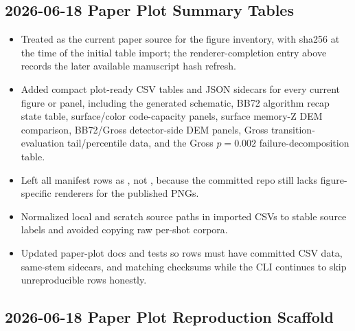 \subsection*{2026-06-18 Paper Plot Summary Tables}

\begin{itemize}
\item Treated \texttt{} as the current paper source for the figure inventory, with sha256 \texttt{} at the time of the initial table import; the renderer-completion entry above records the later available manuscript hash refresh.
\item Added compact plot-ready CSV tables and JSON sidecars for every current figure or panel, including the generated schematic, BB72 algorithm recap state table, surface/color code-capacity panels, surface memory-Z DEM comparison, BB72/Gross detector-side DEM panels, Gross transition-evaluation tail/percentile data, and the Gross \(p=0.002\) failure-decomposition table.
\item Left all manifest rows as \texttt{}, not \texttt{}, because the committed repo still lacks figure-specific renderers for the published PNGs.
\item Normalized local and scratch source paths in imported CSVs to stable source labels and avoided copying raw per-shot corpora.
\item Updated paper-plot docs and tests so \texttt{} rows must have committed CSV data, same-stem sidecars, and matching checksums while the CLI continues to skip unreproducible rows honestly.
\end{itemize}

\subsection*{2026-06-18 Paper Plot Reproduction Scaffold}

